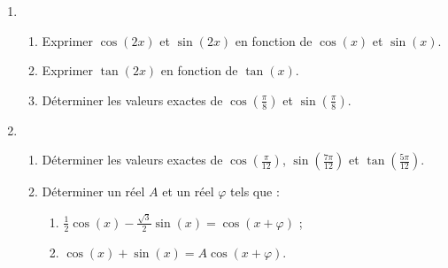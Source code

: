 
\begin{exercice}\label{exostarterST-0009}


\begin{enumerate}
\item \begin{enumerate}
\item Exprimer $\cos (2x)$ et $\sin (2x)$ en fonction de $\cos (x)$ et $\sin (x)$. 
\item Exprimer $\tan (2x)$ en fonction de $\tan (x)$.
\item Déterminer les valeurs exactes de $\displaystyle \cos \left(\frac{\pi}{8}\right)$ et $\displaystyle  \sin \left(\frac{\pi}{8}\right)$.
\end{enumerate}
\item \begin{enumerate}
\item  Déterminer les valeurs exactes de $\displaystyle\cos \left(\frac{\pi}{12}\right)$, $\displaystyle\sin \left(\frac{7\pi}{12}\right)$ et $\displaystyle\tan \left(\frac{5\pi}{12}\right)$.
\item Déterminer un réel $A$ et un réel $\varphi$ tels que : 
  \begin{enumerate}
  \item $\displaystyle \frac{1}{2}\cos( x) - \frac{\sqrt{3}}{2} \sin (x) = \cos(x+\varphi)$ ;
  \item $\cos (x) + \sin (x) = A \cos(x+\varphi)$.
  \end{enumerate}
\end{enumerate}
\end{enumerate}


\end{exercice}
